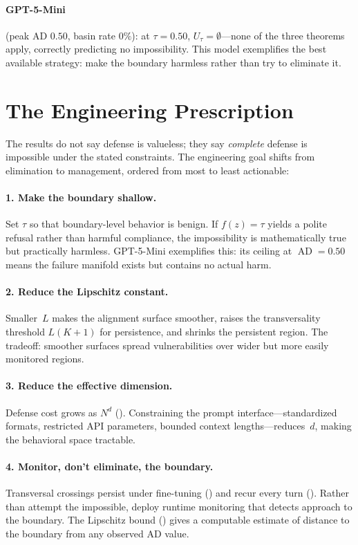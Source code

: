 \documentclass[11pt]{article}
\newcommand{\AD}{\operatorname{AD}}
\begin{document}
\paragraph{GPT-5-Mini} (peak AD $0.50$, basin rate $0\%$): at
$\tau = 0.50$, $U_\tau = \emptyset$---none of the three theorems
apply, correctly predicting no impossibility. This model exemplifies
the best available strategy: make the boundary harmless rather than
try to eliminate it.


\section{The Engineering Prescription}
\label{sec:engineering}

The results do not say defense is valueless; they say \emph{complete}
defense is impossible under the stated constraints. The engineering
goal shifts from elimination to management, ordered from most to least
actionable:

\paragraph{1. Make the boundary shallow.}
Set $\tau$ so that boundary-level behavior is benign. If $f(z) = \tau$
yields a polite refusal rather than harmful compliance, the
impossibility is mathematically true but practically harmless.
GPT-5-Mini exemplifies this: its ceiling at $\AD = 0.50$ means the
failure manifold exists but contains no actual harm.

\paragraph{2. Reduce the Lipschitz constant.}
Smaller~$L$ makes the alignment surface smoother, raises the
transversality threshold $L(K{+}1)$ for persistence, and shrinks the
persistent region. The tradeoff: smoother surfaces spread
vulnerabilities over wider but more easily monitored regions.

\paragraph{3. Reduce the effective dimension.}
Defense cost grows as $N^d$ (). Constraining the prompt
interface---standardized formats, restricted API parameters, bounded
context lengths---reduces~$d$, making the behavioral space tractable.

\paragraph{4. Monitor, don't eliminate, the boundary.}
Transversal crossings persist under fine-tuning ()
and recur every turn (). Rather than attempt the
impossible, deploy runtime monitoring that detects approach to the
boundary. The Lipschitz bound () gives a
computable estimate of distance to the boundary from any observed AD
value.
\end{document}
